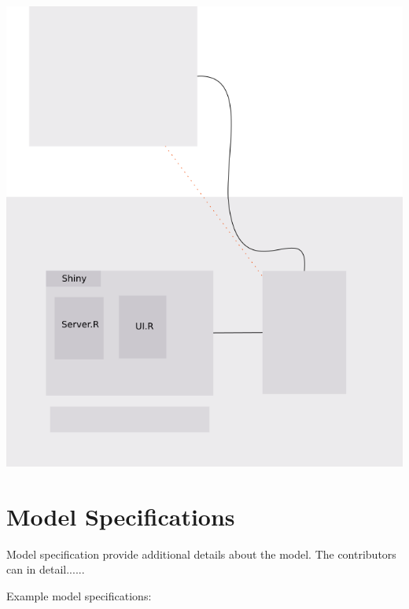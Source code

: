 \documentclass[journal]{IEEEtran}
\begin{document}
\includegraphics[scale=0.35]{../document.png}


\section{Model Specifications}

Model specification provide additional details about the model. The contributors can in detail......


Example model specifications:
\end{document}
